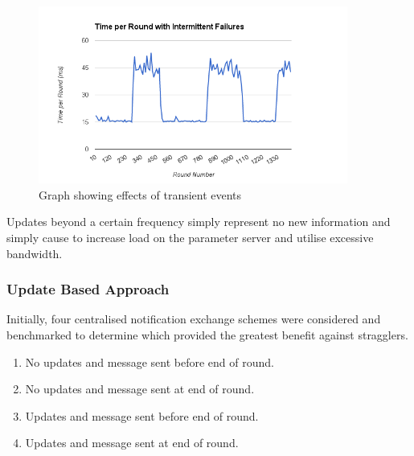 \documentclass[12pt]{article}
\begin{document}
\begin{figure}[H]
  \centering
  \includegraphics[width=4in]{RoundDegradation}
  \caption[]{Graph showing effects of transient events}
  \label{RoundDegradation}
\end{figure}

Updates beyond a certain frequency simply represent no new information and simply cause to increase load on the parameter server and utilise excessive bandwidth.

\subsubsection{Update Based Approach}
Initially, four centralised notification exchange schemes were considered and benchmarked to determine which provided the greatest benefit against stragglers.

\begin{enumerate}
\item No updates and message sent before end of round.
\item No updates and message sent at end of round.
\item Updates and message sent before end of round.
\item Updates and message sent at end of round.
\end{enumerate}
\end{document}
